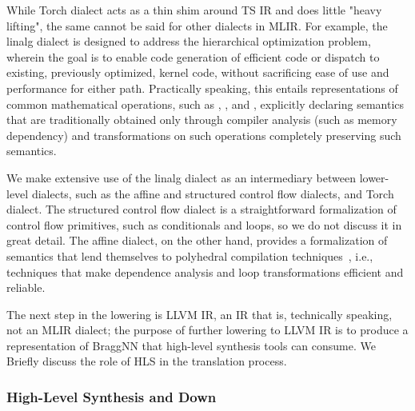 While Torch dialect acts as a thin shim around TS IR and does little "heavy lifting", the same cannot be said for other dialects in MLIR.
For example, the linalg dialect is designed to address the hierarchical optimization problem, wherein the goal is to enable code generation of efficient code or dispatch to existing, previously optimized, kernel code, without sacrificing ease of use and performance for either path.
Practically speaking, this entails representations of common mathematical operations, such as , , and , explicitly declaring semantics that are traditionally obtained only through compiler analysis (such as memory dependency) and transformations on such operations completely preserving such semantics.

We make extensive use of the linalg dialect as an intermediary between lower-level dialects, such as the affine and structured control flow dialects, and Torch dialect.
The structured control flow dialect is a straightforward formalization of control flow primitives, such as conditionals and loops, so we do not discuss it in great detail.
The affine dialect, on the other hand, provides a formalization of semantics that lend themselves to polyhedral compilation techniques~\cite{polyhedral-mlir}, i.e., techniques that make dependence analysis and loop transformations efficient and reliable.

The next step in the lowering is LLVM IR, an IR that is, technically speaking, not an MLIR dialect; the purpose of further lowering to LLVM IR is to produce a representation of BraggNN that high-level synthesis tools can consume.
We Briefly discuss the role of HLS in the translation process.

\subsubsection{High-Level Synthesis and Down}\label{subsec:hlsdown}

